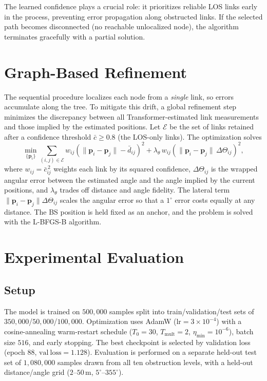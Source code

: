 \documentclass[conference]{IEEEtran}
\begin{document}
The learned confidence plays a crucial role: it prioritizes reliable LOS links
early in the process, preventing error propagation along obstructed links. If
the selected path becomes disconnected (no reachable unlocalized node), the
algorithm terminates gracefully with a partial solution.

\section{Graph-Based Refinement}
\label{sec:graph}

The sequential procedure localizes each node from a \emph{single} link, so
errors accumulate along the tree. To mitigate this drift, a global refinement
step minimizes the discrepancy between all Transformer-estimated link
measurements and those implied by the estimated positions. Let
$\mathcal{E}$ be the set of links retained after a confidence threshold
$\bar{c} \ge 0.8$ (the LOS-only links). The optimization solves
\begin{equation}
  \min_{\{\mathbf{p}_i\}}
  \sum_{(i,j)\in\mathcal{E}} w_{ij}
    \left( \|\mathbf{p}_i-\mathbf{p}_j\| - \bar{d}_{ij} \right)^2
  + \lambda_{\theta}\, w_{ij}
    \left( \|\mathbf{p}_i-\mathbf{p}_j\|\,\Delta\Theta_{ij} \right)^2,
\label{eq:graphcost}
\end{equation}
where $w_{ij} = \bar{c}_{ij}^{\,2}$ weights each link by its squared confidence,
$\Delta\Theta_{ij}$ is the wrapped angular error between the estimated angle and
the angle implied by the current positions, and $\lambda_{\theta}$ trades off
distance and angle fidelity. The lateral term
$\|\mathbf{p}_i-\mathbf{p}_j\|\Delta\Theta_{ij}$ scales the angular error so
that a $1^{\circ}$ error costs equally at any distance. The BS position is held
fixed as an anchor, and the problem is solved with the L-BFGS-B algorithm.

\section{Experimental Evaluation}
\label{sec:results}

\subsection{Setup}
The model is trained on $500{,}000$ samples split into train/validation/test
sets of $350{,}000$/$50{,}000$/$100{,}000$. Optimization uses AdamW
($\mathrm{lr}=3\times10^{-4}$) with a cosine-annealing warm-restart schedule
($T_0=30$, $T_{\mathrm{mult}}=2$, $\eta_{\min}=10^{-6}$), batch size $516$, and
early stopping. The best checkpoint is selected by validation loss (epoch $88$,
$\mathrm{val\ loss}=1.128$). Evaluation is performed on a separate held-out
test set of $1{,}080{,}000$ samples drawn from all ten obstruction levels, with
a held-out distance/angle grid ($2$--$50$\,m, $5^{\circ}$--$355^{\circ}$).
\end{document}
